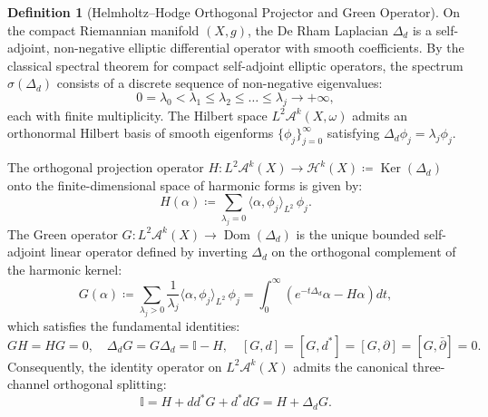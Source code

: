 \documentclass[11pt,a4paper]{article}
\theoremstyle{definition}
\newtheorem{definition}{Definition}[section]
\theoremstyle{plain}
\DeclareMathOperator{\Ker}{Ker}
\begin{document}
\begin{definition}[Helmholtz--Hodge Orthogonal Projector and Green Operator]
\label{def:helmholtz_hodge_decomp}
On the compact Riemannian manifold $(X, g)$, the De Rham Laplacian $\Delta_d$ is a self-adjoint, non-negative elliptic differential operator with smooth coefficients. By the classical spectral theorem for compact self-adjoint elliptic operators, the spectrum $\sigma(\Delta_d)$ consists of a discrete sequence of non-negative eigenvalues:
\begin{equation}
    0 = \lambda_0 < \lambda_1 \le \lambda_2 \le \dots \le \lambda_j \to +\infty,
\end{equation}
each with finite multiplicity. The Hilbert space $L^2\mathcal{A}^k(X, \omega)$ admits an orthonormal Hilbert basis of smooth eigenforms $\{\phi_j\}_{j=0}^\infty$ satisfying $\Delta_d \phi_j = \lambda_j \phi_j$.

The orthogonal projection operator $H: L^2\mathcal{A}^k(X) \to \mathcal{H}^k(X) \coloneqq \Ker(\Delta_d)$ onto the finite-dimensional space of harmonic forms is given by:
\begin{equation}
    \label{eq:harmonic_projector_series}
    H(\alpha) \coloneqq \sum_{\lambda_j = 0} \langle\alpha, \phi_j\rangle_{L^2} \, \phi_j.
\end{equation}
The Green operator $G: L^2\mathcal{A}^k(X) \to \operatorname{Dom}(\Delta_d)$ is the unique bounded self-adjoint linear operator defined by inverting $\Delta_d$ on the orthogonal complement of the harmonic kernel:
\begin{equation}
    \label{eq:green_operator_spectral_series}
    G(\alpha) \coloneqq \sum_{\lambda_j > 0} \frac{1}{\lambda_j} \langle\alpha, \phi_j\rangle_{L^2} \, \phi_j = \int_0^\infty \left( e^{-t \Delta_d}\alpha - H\alpha \right) dt,
\end{equation}
which satisfies the fundamental identities:
\begin{equation}
    \label{eq:green_fundamental_identities}
    G H = H G = 0, \quad \Delta_d G = G \Delta_d = \mathbb{I} - H, \quad [G, d] = [G, d^*] = [G, \partial] = [G, \bar{\partial}] = 0.
\end{equation}
Consequently, the identity operator on $L^2\mathcal{A}^k(X)$ admits the canonical three-channel orthogonal splitting:
\begin{equation}
    \label{eq:hodge_projector_decomp}
    \mathbb{I} = H + d d^* G + d^* d G = H + \Delta_d G.
\end{equation}
\end{definition}
\end{document}
